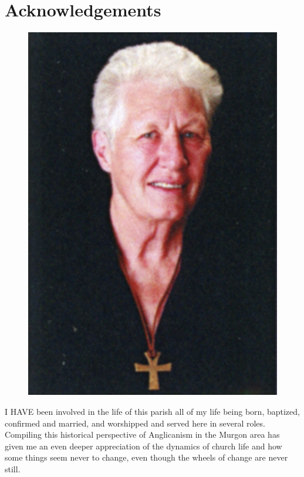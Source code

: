 \balance


\printendnotes[custom]
\setcounter{endnote}{0}
\chapter{Acknowledgements}
\nobalance








\begin{figure}
\begin{center}
\includegraphics[width=.8\linewidth,center]{../images/theAuthor.jpg}
\caption{ }
\end{center}
\end{figure}




\lettrine[lines=3]{I}{ HAVE}
 been involved in the life of this parish all of my life being born, baptized, confirmed and married, and worshipped and served here in several roles. Compiling this historical perspective of Anglicanism in the Murgon area has given me an even deeper appreciation of the dynamics of church life and how some things seem never to change, even though the wheels of change are never still.

